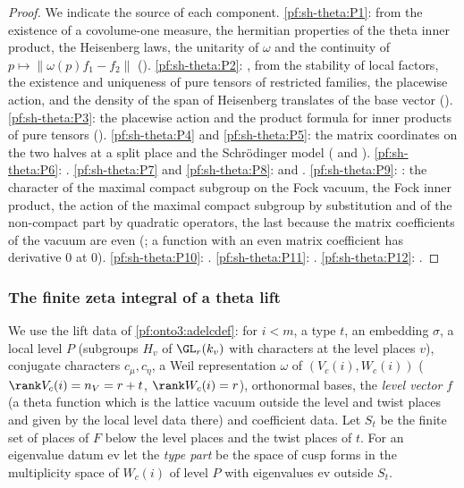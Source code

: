 \begin{proof}
We indicate the source of each component. \ref{pf:sh-theta:P1}: from the existence of a covolume-one measure, the hermitian
properties of the theta inner product, the Heisenberg laws, the unitarity of $\omega$ and the continuity of
$p\mapsto\|\omega(p)f_1-f_2\|$ ().
\ref{pf:sh-theta:P2}: , from the stability of local factors, the existence and
uniqueness of pure tensors of restricted families, the placewise action, and the density of the span of Heisenberg translates of
the base vector ().
\ref{pf:sh-theta:P3}: the placewise action and the product formula for inner products of pure tensors
(). \ref{pf:sh-theta:P4} and \ref{pf:sh-theta:P5}: the matrix coordinates on the
two halves at a split place and the Schr\"odinger model
( and ).
\ref{pf:sh-theta:P6}: . \ref{pf:sh-theta:P7} and
\ref{pf:sh-theta:P8}:
 and .
\ref{pf:sh-theta:P9}: : the character of the maximal compact subgroup on the Fock
vacuum, the Fock inner product, the action of the maximal compact subgroup by substitution and of the non-compact part by
quadratic operators, the last because the matrix coefficients of the vacuum are even
(; a function with an even matrix coefficient has derivative $0$ at
$0$). \ref{pf:sh-theta:P10}: . \ref{pf:sh-theta:P11}:
. \ref{pf:sh-theta:P12}:
.
\end{proof}

\subsubsection{The finite zeta integral of a theta lift}

We use the lift data of \cref{pf:onto3:adelcdef}: for $i<m$, a type $t$, an embedding $\sigma$, a local level $P$ (subgroups
$H_v$ of $\GL_r(k_v)$ with characters at the level places $v$), conjugate characters $c_\mu,c_\eta$, a Weil representation $\omega$
of $(V_c(i),W_c(i))$ ($\rank V_c(i)=n_V=r+t$, $\rank W_c(i)=r$), orthonormal bases, the \emph{level vector} $f$ (a theta function
which is the lattice vacuum outside the level and twist places and given by the local level data there) and coefficient data. Let
$S_t$ be the finite set of places of $F$ below the level places and the twist places of $t$. For an eigenvalue datum $\mathrm{ev}$ let
the \emph{type part} be the space of cusp forms in the multiplicity space of $W_c(i)$ of level $P$ with eigenvalues $\mathrm{ev}$
outside $S_t$.

